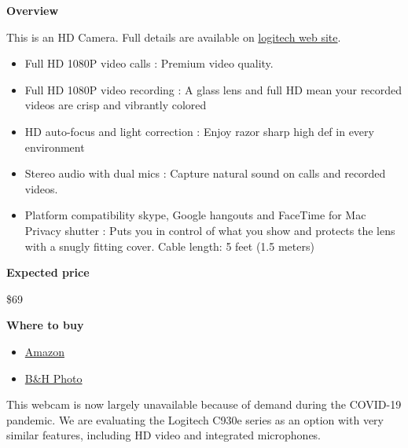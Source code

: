 \begin{gram}
\label{grm:logitech::920::main}
\textbf{Overview}

This is an HD Camera.  Full details are available on 
%
\href{https://www.logitech.com/en-us/product/hd-pro-webcam-c920s}{logitech web site}.
%
\begin{itemize}
\item
Full HD 1080P video calls : Premium video quality.
\item
Full HD 1080P video recording : A glass lens and full HD mean your recorded videos are crisp and vibrantly colored
\item
HD auto-focus and light correction : Enjoy razor sharp high def in every environment

\item
Stereo audio with dual mics : Capture natural sound on calls and recorded videos. 

\item 
Platform compatibility skype, Google hangouts and FaceTime for Mac
Privacy shutter : Puts you in control of what you show and protects the lens with a snugly fitting cover. Cable length: 5 feet (1.5 meters)
\end{itemize}


\textbf{Expected price}

\$69

\textbf{Where to buy}

\begin{itemize}
\item
\href{https://www.amazon.com/Logitech-Widescreen-Calling-Recording-Desktop/dp/B006JH8T3S/ref=sr_1_2?crid=2T6CQ3HNRR1XR&keywords=logitech+c920&qid=1582900645&s=electronics&sprefix=logitech+c,electronics,172&sr=1-2}{Amazon}
\item
\href{https://www.bhphotovideo.com/c/product/1461727-REG/logitech_960_001257_c920s_hd_pro_webcam.html}{B\&H Photo}
\end{itemize}

This webcam is now largely unavailable because of demand during the
COVID-19 pandemic. We are evaluating the Logitech C930e series as an
option with very similar features, including HD video and integrated
microphones.
\end{gram}


